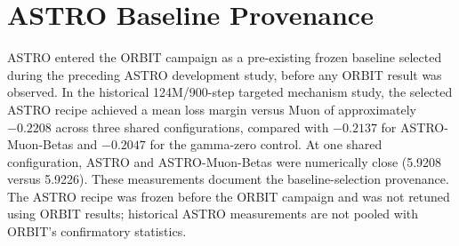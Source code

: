 \section{ASTRO Baseline Provenance}
ASTRO entered the ORBIT campaign as a pre-existing frozen baseline selected during the
preceding ASTRO development study, before any ORBIT result was observed. In the historical
124M/900-step targeted mechanism study, the selected ASTRO recipe achieved a mean loss
margin versus Muon of approximately $-0.2208$ across three shared configurations, compared
with $-0.2137$ for ASTRO-Muon-Betas and $-0.2047$ for the gamma-zero control. At one shared
configuration, ASTRO and ASTRO-Muon-Betas were numerically close (5.9208 versus 5.9226).
These measurements document the baseline-selection provenance. The ASTRO recipe was frozen
before the ORBIT campaign and was not retuned using ORBIT results; historical ASTRO
measurements are not pooled with ORBIT's confirmatory statistics.
